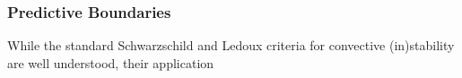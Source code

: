 {\color{brown}
\subsubsection{Predictive Boundaries}

While the standard Schwarzschild and Ledoux criteria for convective (in)stability are well understood, their application 

}